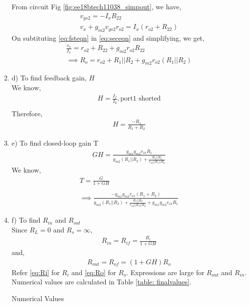 \begin{enumerate}[label=\arabic*.,ref=\theenumi]
From circuit Fig \ref{fig:ee18btech11038_simpout}, we have,
\begin{align}
\label{eq:fsteqn}
    v_{gs2} = -I_{x}R_{22}\\
\label{eq:seceqn}
    v_{x} + g_{m2}v_{gs2}r_{o2} = I_{x}(r_{o2} + R_{22})
\end{align}
On subtituting \ref{eq:fsteqn} in \ref{eq:seceqn} and simplifying, we get,
\begin{align}
    \frac{v_{x}}{I_{x}} = r_{o2} + R_{22} + g_{m2}r_{o2}R_{22}\\
\label{eq:Ro}
    \implies R_{o} =r_{o2} + R_{1}||R_{2} + g_{m2}r_{o2}(R_{1}||R_{2})
\end{align}
\item d) To find feedback gain, $H$\\
\solution We know,
\begin{align}
    H = \frac{I_{f}}{I_{0}}, \text{port1 shorted}\\
\end{align}
Therefore,
\begin{align}
    H = \frac{-R_{1}}{R_{1} + R_{2}}
\end{align}
\item e) To find closed-loop gain T\\
\solution 
\begin{align}
    GH = \frac{g_{m1}g_{m2}r_{o1}R_{1}}{g_{m2}(R_{1}||R_{2}) + \frac{R_{1}||R_{2}}{r_{o2}||R_{1}||R_{2}}}
\end{align}
We know, 
\begin{align}
    T = \frac{G}{1+GH}\\ \\
    \implies \frac{-g_{m1}g_{m2}r_{o1}(R_{1} + R_{2})}{g_{m2}(R_{1}||R_{2}) + \frac{R_{1}||R_{2}}{r_{o2}||R_{1}||R_{2}} +g_{m1}g_{m2}r_{o1}R_{1}}
\end{align}
\item f) To find $R_{in}$ and $R_{out}$\\
\solution Since $R_{L} =0$ and $R_{s} =\infty$,
\begin{align}
    R_{in} = R_{if} =\frac{R_{i}}{1+GH}
\end{align}
and,
\begin{align}
    R_{out} = R_{of} = (1+GH)R_{o}
\end{align}
Refer \ref{eq:Ri} for $R_{i}$ and \ref{eq:Ro} for $R_{o}$.
Expressions are large for $R_{out}$ and $R_{in}$. Numerical values are calculated in Table \ref{table: finalvalues}.
\begin{table}[!ht]
\centering

\caption{Numerical Values}
\label{table: finalvalues}
\end{table}

\end{enumerate}
